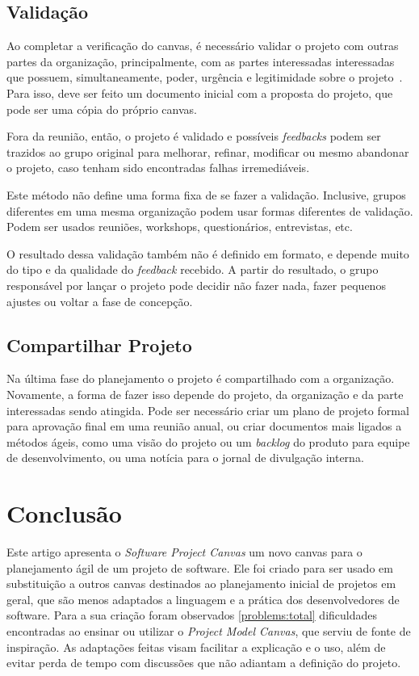 \documentclass[a4]{report}
\begin{document}
\subsection{Validação}

Ao completar a verificação do canvas, é necessário validar o projeto com outras partes da organização, principalmente, com as partes interessadas interessadas que possuem, simultaneamente, poder, urgência e legitimidade sobre o projeto~\citep{mitchell_toward_1997}. Para isso, deve ser feito um documento inicial com a proposta do projeto, que pode ser uma cópia do próprio canvas.

Fora da reunião, então, o projeto é validado e possíveis \textit{feedbacks} podem ser trazidos ao grupo original para melhorar, refinar, modificar ou mesmo abandonar o projeto, caso tenham sido encontradas falhas irremediáveis.


Este método não define uma forma fixa de se fazer a validação. Inclusive, grupos diferentes em uma mesma organização podem usar formas diferentes de validação. Podem ser usados reuniões, workshops, questionários, entrevistas, etc.

O resultado dessa validação também não é definido em formato, e depende muito do tipo e da qualidade do \textit{feedback} recebido. A partir do resultado, o grupo responsável por lançar o projeto pode decidir não fazer nada, fazer pequenos ajustes ou voltar a fase de concepção.

\subsection{Compartilhar Projeto}

Na última fase do planejamento o projeto é compartilhado com a organização. Novamente, a forma de fazer isso depende do projeto, da organização e da parte interessadas sendo atingida.  Pode ser necessário criar um plano de projeto formal para aprovação final em uma reunião anual, ou criar documentos mais ligados a métodos ágeis, como uma  visão do projeto ou um \textit{backlog} do produto para equipe de desenvolvimento, ou uma notícia para o jornal de divulgação interna.






\section{Conclusão}

Este artigo apresenta o \textit{Software Project Canvas} um novo canvas para o planejamento ágil de um projeto de software. Ele foi criado para ser usado em substituição a outros canvas destinados ao planejamento inicial de projetos em geral, que são menos adaptados a linguagem e a prática dos desenvolvedores de software. Para a sua  criação foram observados \ref{problems:total} dificuldades encontradas ao ensinar ou utilizar o \textit{Project Model Canvas}, que serviu de fonte de inspiração. As adaptações feitas visam facilitar a explicação e o uso, além de evitar perda de tempo com discussões que não adiantam a definição do projeto.
\end{document}
